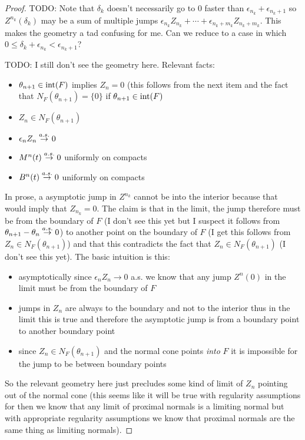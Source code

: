 \begin{proof}
TODO: Note that $\delta_k$ doesn't necessarily go to 0 faster than $\epsilon_{n_k} + \epsilon_{n_k + 1}$ so $Z^{n_k}(\delta_k)$ may be a sum of multiple jumps $\epsilon_{n_k} Z_{n_k} + \dotsb + \epsilon_{n_k + m_k} Z_{n_k + m_k}$.  This makes the geometry a tad confusing for me.  Can we reduce to a case in which $0 \leq \delta_k + \epsilon_{n_k} < \epsilon_{n_k+1}$?


TODO: I still don't see the geometry here.  Relevant facts: 
\begin{itemize}
\item $\theta_{n+1} \in \operatorname*{int}(F)$ implies $Z_n = 0$ (this follows from the next item and the fact that $N_F(\theta_{n+1}) = \lbrace 0 \rbrace$ if $\theta_{n+1} \in \operatorname*{int}(F)$
\item $Z_n \in N_F(\theta_{n+1})$
\item $\epsilon_n Z_n \overset{a.s.}\to 0$
\item $M^n(t) \overset{a.s.}\to 0$ uniformly on compacts
\item $B^n(t) \overset{a.s.}\to 0$ uniformly on compacts
\end{itemize}
In prose, a asymptotic jump in $Z^{n_k}$ cannot be into the interior because that would imply that $Z_{n_k} = 0$.  The claim is that in the limit, the jump therefore must be from the boundary of $F$ (I don't see this yet but I suspect it follows from $\theta_{n+1} - \theta_n \overset{a.s.}\to 0$) to another point on the boundary of $F$ (I get this follows from $Z_n \in N_F(\theta_{n+1})$) and that this contradicts the fact that $Z_n \in N_F(\theta_{n+1})$ (I don't see this yet).  The basic intuition is this: 
\begin{itemize}
\item asymptotically since $\epsilon_n Z_n \to 0$ a.s. we know that any jump $Z^n(0)$ in the limit must be from the boundary of $F$
\item jumps in $Z_n$ are always to the boundary and not to the interior thus in the limit this is true and therefore the asymptotic jump is from a boundary point to another boundary point
\item since $Z_n \in N_F(\theta_{n+1})$ and the normal cone points \emph{into} $F$ it is impossible for the jump to be between boundary points
\end{itemize}
So the relevant geometry here just precludes some kind of limit of $Z_n$ pointing out of the normal cone (this seems like it will be true with regularity assumptions for then we know that any limit of proximal normals is a limiting normal but with appropriate regularity assumptions we know that proximal normals are the same thing as limiting normals).


\end{proof}
